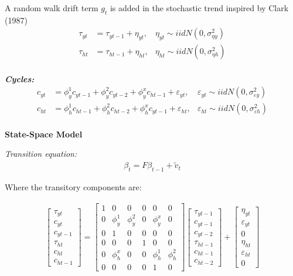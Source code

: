 \documentclass[12pt]{article}
\begin{document}
\begin{outline}[enumerate]
		A random walk drift term $g_t$ is added in the stochastic trend inspired by Clark (1987)
		\begin{align}
		\tau_{yt} &= \tau_{yt-1} + \eta_{yt}, &\eta_{yt} \sim iidN(0,\sigma^2_{\eta y})
		\\
		\tau_{ht} &= \tau_{ht-1} + \eta_{ht}, &\eta_{ht} \sim iidN(0,\sigma^2_{\eta h})	
		\end{align}
		\\
		\textbf{\textit{Cycles:}}
		\begin{align}
		c_{yt} &= \phi^1_{y}c_{yt-1}  
		+ \phi^2_{y}c_{yt-2}  
		+ \phi^x_{y}c_{ht-1} 
		+ \varepsilon_{yt},
		&\varepsilon_{yt} \sim iidN(0,\sigma^2_{\varepsilon y})		   
		\\
		c_{ht} &= \phi^1_{h}c_{ht-1}  
		+ \phi^2_{h}c_{ht-2}
		+ \phi^x_{h}c_{yt-1}  
		+ \varepsilon_{ht},
		&\varepsilon_{ht} \sim iidN(0,\sigma^2_{\varepsilon h})
		\end{align}
		\\
		
		
		\textbf{State-Space Model}
		
		\textit{Transition equation:}
		\begin{align}
		\beta_t = F\beta_{t-1} + \tilde{v}_t
		\end{align}
		
		Where the transitory components are:
		
		\begin{align}
		\begin{bmatrix}
		\tau_{yt}	\\
		c_{yt}		\\
		c_{yt-1}		\\
		\tau_{ht}	\\
		c_{ht}		\\
		c_{ht-1}		
		\end{bmatrix}
		=
		\begin{bmatrix}
		1	& 0	& 0	& 0	& 0	& 0	\\
		0	& \phi^1_y	& \phi^2_y	& 0	& \phi^x_y	& 0	\\
		0	& 1	& 0	& 0 & 0 & 0  \\
		0	& 0	& 0	& 1	& 0	& 0 \\
		0	& \phi^x_h	& 0	& 0 &\phi^1_h	& \phi^2_h	\\
		0	& 0	& 0	& 0 & 1 & 0
		\end{bmatrix}
		\begin{bmatrix}
		\tau_{yt-1}	\\
		c_{yt-1}		\\
		c_{yt-2}		\\
		\tau_{ht-1}	\\
		c_{ht-1}		\\
		c_{ht-2}		
		\end{bmatrix}
		+
		\begin{bmatrix}
		\eta_{yt}	\\
		\varepsilon_{yt}		\\
		0	\\
		\eta_{ht}	\\
		\varepsilon_{ht}		\\
		0	
		\end{bmatrix}
		\end{align}
		

\end{outline}
\end{document}
